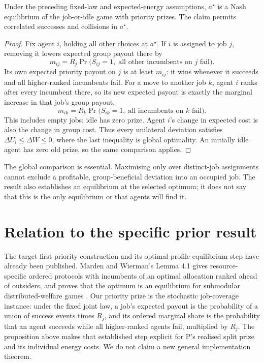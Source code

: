 \documentclass{article}
\begin{document}
\begin{proposition}
Under the preceding fixed-law and expected-energy assumptions, \(a^\star\) is a Nash equilibrium of the job-or-idle game with priority prizes. The claim permits correlated successes and collisions in \(a^\star\). %
\end{proposition}

\begin{proof}
Fix agent \(i\), holding all other choices at \(a^\star\). If \(i\) is assigned to job \(j\), removing it lowers expected group payout there by %
\[
m_{ij}=R_j\Pr\bigl(S_{ij}=1,\;\text{all other incumbents on }j\text{ fail}\bigr).
\]
Its own expected priority payout on \(j\) is at least \(m_{ij}\): it wins whenever it succeeds and all higher-ranked incumbents fail. For a move to another job \(k\), agent \(i\) ranks after every incumbent there, so its new expected payout is exactly the marginal increase in that job's group payout, %
\[
m_{ik}=R_k\Pr\bigl(S_{ik}=1,\;\text{all incumbents on }k\text{ fail}\bigr).
\]
This includes empty jobs; idle has zero prize. Agent \(i\)'s change in expected cost is also the change in group cost. Thus every unilateral deviation satisfies \(\Delta U_i\leq\Delta W\leq0\), where the last inequality is global optimality. An initially idle agent has zero old prize, so the same comparison applies. %
\end{proof}

The global comparison is essential. Maximising only over distinct-job assignments cannot exclude a profitable, group-beneficial deviation into an occupied job. The result also establishes an equilibrium at the selected optimum; it does not say that this is the only equilibrium or that agents will find it. %

\section{Relation to the specific prior result}

The target-first priority construction and its optimal-profile equilibrium step have already been published. Marden and Wierman's Lemma 4.1 gives resource-specific ordered protocols with incumbents of an optimal allocation ranked ahead of outsiders, and proves that the optimum is an equilibrium for submodular distributed-welfare games \cite{marden2013overcoming}. Our priority prize is the stochastic job-coverage instance: under the fixed joint law, a job's expected payout is the probability of a union of success events times \(R_j\), and its ordered marginal share is the probability that an agent succeeds while all higher-ranked agents fail, multiplied by \(R_j\). The proposition above makes that established step explicit for P's realised split prize and its individual energy costs. We do not claim a new general implementation theorem. %
\end{document}
